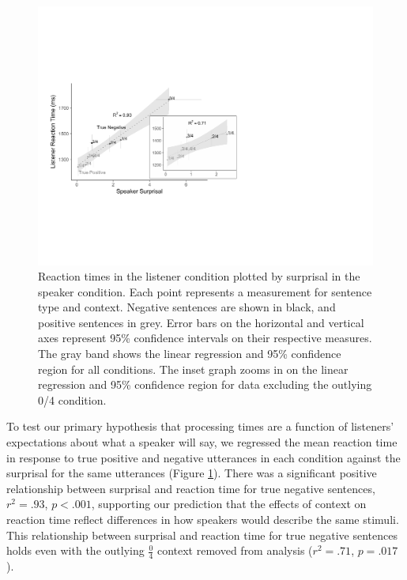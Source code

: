 \documentclass[man, noapacite]{apa2}
\begin{document}
\begin{figure}[t]
\begin{center} 
\includegraphics[width=6in]{figures/surprisal_rt_v3.pdf}
\caption{\label{fig:scatter} Reaction times in the listener condition plotted by surprisal in the speaker condition. Each point represents a measurement for sentence type and context. Negative sentences are shown in black, and positive sentences in grey. Error bars on the horizontal and vertical axes represent 95\% confidence intervals on their respective measures. The gray band shows the linear regression and  95\% confidence region for all conditions. The inset graph zooms in on the linear regression and 95\% confidence region for data excluding the outlying 0/4 condition.}
\end{center} 
\end{figure}

To test our primary hypothesis that processing times are a function of listeners' expectations about what a speaker will say, we regressed the mean reaction time in response to true positive and negative utterances in each condition against the surprisal for the same utterances (Figure \ref{fig:scatter}).  There was a significant positive relationship between surprisal and reaction time for true negative sentences, $r^2=.93$, $p<.001$, supporting our prediction that the effects of context on reaction time reflect differences in how speakers would describe the same stimuli. This relationship between surprisal and reaction time for true negative sentences holds even with the outlying $\frac{0}{4}$ context removed from analysis ($r^2=.71$, $p = .017$).
\end{document}
